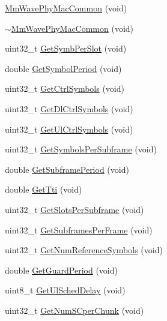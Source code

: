 \begin{DoxyCompactItemize}
\item 
\hyperlink{classns3_1_1MmWavePhyMacCommon_aba4d655352f50b5378b664f06f5ead1b}{Mm\+Wave\+Phy\+Mac\+Common} (void)
\item 
\hyperlink{classns3_1_1MmWavePhyMacCommon_a3b309ecadf1f89eabd321d1d01954742}{$\sim$\+Mm\+Wave\+Phy\+Mac\+Common} (void)
\item 
uint32\+\_\+t \hyperlink{classns3_1_1MmWavePhyMacCommon_a752df2d4b9973d8bd832123303f49422}{Get\+Symb\+Per\+Slot} (void)
\item 
double \hyperlink{classns3_1_1MmWavePhyMacCommon_a1048fa4a24a72abc5d4d982efd6c21af}{Get\+Symbol\+Period} (void)
\item 
uint32\+\_\+t \hyperlink{classns3_1_1MmWavePhyMacCommon_a39bc1d381ab7c07d6a2c5ef14c2f8a1e}{Get\+Ctrl\+Symbols} (void)
\item 
uint32\+\_\+t \hyperlink{classns3_1_1MmWavePhyMacCommon_a1be2da684374de93d7f501aab2441b5a}{Get\+Dl\+Ctrl\+Symbols} (void)
\item 
uint32\+\_\+t \hyperlink{classns3_1_1MmWavePhyMacCommon_aa0bf8af14050bc5dc6513fbc86319a9b}{Get\+Ul\+Ctrl\+Symbols} (void)
\item 
uint32\+\_\+t \hyperlink{classns3_1_1MmWavePhyMacCommon_a2fe835b76e3c689defa413e395cd10cb}{Get\+Symbols\+Per\+Subframe} (void)
\item 
double \hyperlink{classns3_1_1MmWavePhyMacCommon_a1d402260d29c8931dd3dde73b295e23d}{Get\+Subframe\+Period} (void)
\item 
double \hyperlink{classns3_1_1MmWavePhyMacCommon_ab0dbb4e5740a37c07e7a4d93f1747d6e}{Get\+Tti} (void)
\item 
uint32\+\_\+t \hyperlink{classns3_1_1MmWavePhyMacCommon_a7b6552d2e0ffbeaf3bc2f9db6d0d6e63}{Get\+Slots\+Per\+Subframe} (void)
\item 
uint32\+\_\+t \hyperlink{classns3_1_1MmWavePhyMacCommon_a3709cf52f6813eb8ad1af16d95082dc1}{Get\+Subframes\+Per\+Frame} (void)
\item 
uint32\+\_\+t \hyperlink{classns3_1_1MmWavePhyMacCommon_aa68466997d082adc450d3385f09fc35a}{Get\+Num\+Reference\+Symbols} (void)
\item 
double \hyperlink{classns3_1_1MmWavePhyMacCommon_a6c32a3c37fed1c8af2cb206ce3e64b06}{Get\+Guard\+Period} (void)
\item 
uint8\+\_\+t \hyperlink{classns3_1_1MmWavePhyMacCommon_afd70935ec71838fefe6a8e18198f19cb}{Get\+Ul\+Sched\+Delay} (void)
\item 
uint32\+\_\+t \hyperlink{classns3_1_1MmWavePhyMacCommon_a724771405a9e4d3e2ee251be4aff8abc}{Get\+Num\+S\+Cper\+Chunk} (void)

\end{DoxyCompactItemize}
